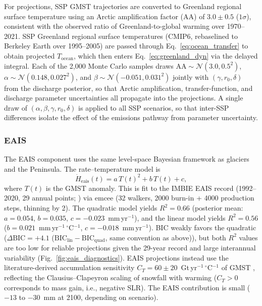 \documentclass[12pt]{article}
\begin{document}
For projections, SSP GMST trajectories are converted to Greenland regional surface temperature using an Arctic amplification factor (AA) of $3.0 \pm 0.5$ ($1\sigma$), consistent with the observed ratio of Greenland-to-global warming over 1970--2021. SSP Greenland regional surface temperatures (CMIP6, rebaselined to Berkeley Earth over 1995--2005) are passed through Eq.~\eqref{eq:ocean_transfer} to obtain projected $T_{\mathrm{ocean}}$, which then enters Eq.~\eqref{eq:greenland_dyn} via the delayed integral. Each of the 2,000 Monte Carlo samples draws $\mathrm{AA} \sim \mathcal{N}(3.0, 0.5^2)$, $\alpha \sim \mathcal{N}(0.148, 0.027^2)$, and $\beta \sim \mathcal{N}(-0.051, 0.031^2)$ jointly with $(\gamma, r_0, \delta)$ from the discharge posterior, so that Arctic amplification, transfer-function, and discharge parameter uncertainties all propagate into the projections. A single draw of $(\alpha, \beta, \gamma, r_0, \delta)$ is applied to all SSP scenarios, so that inter-SSP differences isolate the effect of the emissions pathway from parameter uncertainty.

\subsubsection{EAIS}
The EAIS component uses the same level-space Bayesian framework as glaciers and the Peninsula. The rate--temperature model is
\begin{equation}
	\dot{H}_{\mathrm{eais}}(t) = a\,T(t)^2 + b\,T(t) + c,
	\label{eq:eais_rate}
\end{equation}
where $T(t)$ is the GMST anomaly. This is fit to the IMBIE EAIS record (1992--2020, 29 annual points; \cite{Otosaka2023}) via emcee (32 walkers, 2000 burn-in + 4000 production steps, thinning by 2). The quadratic model yields $R^2 = 0.66$ (posterior mean: $a = 0.054$, $b = 0.035$, $c = -0.023$~mm\,yr$^{-1}$), and the linear model yields $R^2 = 0.56$ ($b = 0.021$~mm\,yr$^{-1}$\,$^\circ$C$^{-1}$, $c = -0.018$~mm\,yr$^{-1}$). BIC weakly favors the quadratic ($\Delta\mathrm{BIC} = +4.1$ ($\mathrm{BIC}_{\mathrm{lin}} - \mathrm{BIC}_{\mathrm{quad}}$, same convention as above)), but both $R^2$ values are too low for reliable projections given the 29-year record and large interannual variability (Fig.~\ref{fig:eais_diagnostics}). EAIS projections instead use the literature-derived accumulation sensitivity $C_T = 60 \pm 20$~Gt\,yr$^{-1}$\,$^\circ$C$^{-1}$ of GMST \citep{Frieler2015, Ligtenberg2013}, reflecting the Clausius--Clapeyron scaling of snowfall with warming ($C_T > 0$ corresponds to mass gain, i.e., negative SLR). The EAIS contribution is small ($-13$ to $-30$~mm at 2100, depending on scenario).
\end{document}
